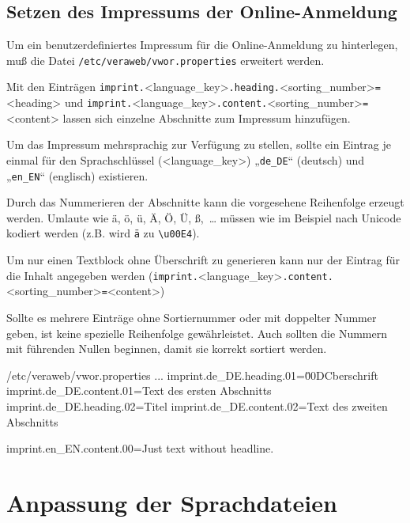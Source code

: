 \documentclass{tarentanleitung}
\begin{document}
\subsection{Setzen des Impressums der Online-Anmeldung}\label{sec:imprint-oa}

Um ein benutzerdefiniertes Impressum für die Online-Anmeldung zu hinterlegen,
muß die Datei \texttt{/etc/veraweb/vwor.properties} erweitert werden.

Mit den Einträgen \texttt{imprint.}<language\_key>\texttt{.heading.}<sorting\_number>\texttt{=}<heading>
und \texttt{imprint.}<language\_key>\texttt{.content.}<sorting\_number>\texttt{=}<content>
lassen sich einzelne Abschnitte zum Impressum hinzufügen.

Um das Impressum mehrsprachig zur Verfügung zu stellen, sollte ein Eintrag je
einmal für den Sprachschlüssel (<language\_key>) „\texttt{de\_DE}“ (deutsch)
und „\texttt{en\_EN}“ (englisch) existieren.

Durch das Nummerieren der Abschnitte kann die vorgesehene Reihenfolge erzeugt werden.
Umlaute wie ä, ö, ü, Ä, Ö, Ü, ß,~… müssen wie im Beispiel nach Unicode kodiert
werden (z.B. wird \texttt{ä} zu \texttt{\textbackslash{}u00E4}).

Um nur einen Textblock ohne Überschrift zu generieren kann nur der Eintrag
für die Inhalt angegeben werden (\texttt{imprint.}<language\_key>\texttt{.content.}<sorting\_number>\texttt{=}<content>)

Sollte es mehrere Einträge ohne Sortiernummer oder mit doppelter Nummer geben,
ist keine spezielle Reihenfolge gewährleistet. Auch sollten die Nummern mit
führenden Nullen beginnen, damit sie korrekt sortiert werden.

\begin{minipage}{\linewidth}
\begin{lstdump}{/etc/veraweb/vwor.properties}
...
imprint.de_DE.heading.01=\u00DCberschrift
imprint.de_DE.content.01=Text des ersten Abschnitts
imprint.de_DE.heading.02=Titel
imprint.de_DE.content.02=Text des zweiten Abschnitts

imprint.en_EN.content.00=Just text without headline.
\end{lstdump}
\end{minipage}

\section{Anpassung der Sprachdateien}\label{sec:l10n}
\end{document}
